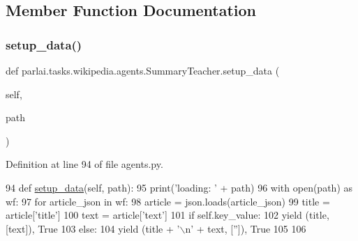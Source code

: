\subsection{Member Function Documentation}
\mbox{\label{classparlai_1_1tasks_1_1wikipedia_1_1agents_1_1SummaryTeacher_a055d6fcf2d4149c08b141f30fa7dbd1c}} 
\subsubsection{\texorpdfstring{setup\+\_\+data()}{setup\_data()}}
{\footnotesize\ttfamily def parlai.\+tasks.\+wikipedia.\+agents.\+Summary\+Teacher.\+setup\+\_\+data (\begin{DoxyParamCaption}\item[{}]{self,  }\item[{}]{path }\end{DoxyParamCaption})}



Definition at line 94 of file agents.\+py.


\begin{DoxyCode}
94     \textcolor{keyword}{def }\hyperlink{namespaceparlai_1_1tasks_1_1multinli_1_1agents_a4fa2cb0ba1ed745336ad8bceed36b841}{setup\_data}(self, path):
95         print(\textcolor{stringliteral}{'loading: '} + path)
96         with open(path) \textcolor{keyword}{as} wf:
97             \textcolor{keywordflow}{for} article\_json \textcolor{keywordflow}{in} wf:
98                 article = json.loads(article\_json)
99                 title = article[\textcolor{stringliteral}{'title'}]
100                 text = article[\textcolor{stringliteral}{'text'}]
101                 \textcolor{keywordflow}{if} self.key\_value:
102                     \textcolor{keywordflow}{yield} (title, [text]), \textcolor{keyword}{True}
103                 \textcolor{keywordflow}{else}:
104                     \textcolor{keywordflow}{yield} (title + \textcolor{stringliteral}{'\(\backslash\)n'} + text, [\textcolor{stringliteral}{''}]), \textcolor{keyword}{True}
105 
106 
\end{DoxyCode}


